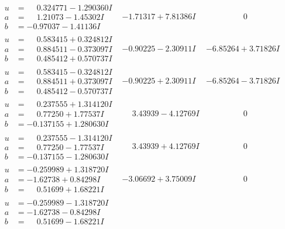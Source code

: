 \documentclass[1p]{elsarticle_modified}
\theoremstyle{definition}
\begin{document}
$$\begin{array}{c|c|c}
\begin{aligned}
u &= \phantom{-}0.324771 - 1.290360 I \\
a &= \phantom{-}1.21073 - 1.45302 I \\
b &= -0.97037 - 1.41136 I\end{aligned}
 & -1.71317 + 7.81386 I & \phantom{-0.000000 } 0 \\ \hline\begin{aligned}
u &= \phantom{-}0.583415 + 0.324812 I \\
a &= \phantom{-}0.884511 - 0.373097 I \\
b &= \phantom{-}0.485412 + 0.570737 I\end{aligned}
 & -0.90225 - 2.30911 I & -6.85264 + 3.71826 I \\ \hline\begin{aligned}
u &= \phantom{-}0.583415 - 0.324812 I \\
a &= \phantom{-}0.884511 + 0.373097 I \\
b &= \phantom{-}0.485412 - 0.570737 I\end{aligned}
 & -0.90225 + 2.30911 I & -6.85264 - 3.71826 I \\ \hline\begin{aligned}
u &= \phantom{-}0.237555 + 1.314120 I \\
a &= \phantom{-}0.77250 + 1.77537 I \\
b &= -0.137155 + 1.280630 I\end{aligned}
 & \phantom{-}3.43939 - 4.12769 I & \phantom{-0.000000 } 0 \\ \hline\begin{aligned}
u &= \phantom{-}0.237555 - 1.314120 I \\
a &= \phantom{-}0.77250 - 1.77537 I \\
b &= -0.137155 - 1.280630 I\end{aligned}
 & \phantom{-}3.43939 + 4.12769 I & \phantom{-0.000000 } 0 \\ \hline\begin{aligned}
u &= -0.259989 + 1.318720 I \\
a &= -1.62738 + 0.84298 I \\
b &= \phantom{-}0.51699 + 1.68221 I\end{aligned}
 & -3.06692 + 3.75009 I & \phantom{-0.000000 } 0 \\ \hline\begin{aligned}
u &= -0.259989 - 1.318720 I \\
a &= -1.62738 - 0.84298 I \\
b &= \phantom{-}0.51699 - 1.68221 I\end{aligned}

\end{array}$$
\end{document}
